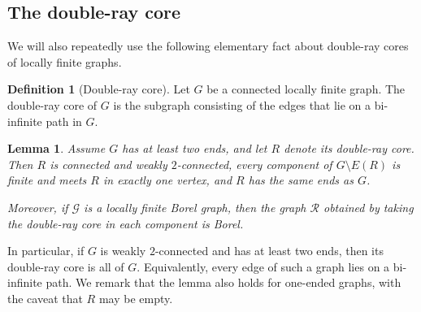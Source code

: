\documentclass{article}
\theoremstyle{plain}
\newtheorem{lem}[thm]{Lemma}
\theoremstyle{definition}
\newtheorem{defn}[thm]{Definition}
\newcommand{\cG}{\mathcal{G}}
\newcommand{\cR}{\mathcal{R}}
\begin{document}
\subsection{The double-ray core}

We will also repeatedly use the following elementary fact about double-ray cores of locally finite graphs.

\begin{defn}[Double-ray core]
Let $G$ be a connected locally finite graph. The double-ray core of $G$ is the subgraph consisting of the edges that lie on a bi-infinite path in $G$.    
\end{defn}

\begin{lem}\label{lem:double_ray_core} Assume $G$ has at least two ends, and let $R$ denote its double-ray core. Then $R$ is connected and weakly $2$-connected, every component of $G\setminus E(R)$ is finite and meets $R$ in exactly one vertex, and $R$ has the same ends as $G$. 

Moreover, if $\cG$ is a locally finite Borel graph, then the graph $\cR$ obtained by taking the double-ray core in each component is Borel.
\end{lem}

In particular, if $G$ is weakly $2$-connected and has at least two ends, then its double-ray core is all of $G$. Equivalently, every edge of such a graph lies on a bi-infinite path. We remark that the lemma also holds for one-ended graphs, with the caveat that $R$ may be empty.
\end{document}

